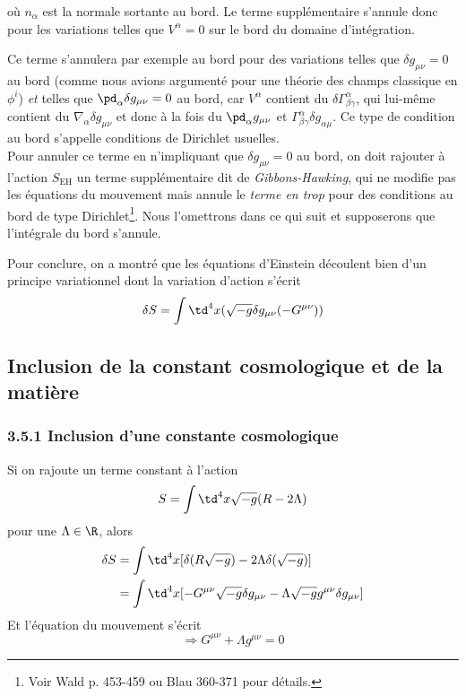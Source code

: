 où $n_{\alpha}$ est la normale sortante au bord. Le terme supplémentaire s'annule donc pour les variations telles que $V^\alpha =0$ sur le bord du domaine d'intégration.
\begin{rmk}
    Ce terme s'annulera par exemple au bord pour des variations telles que $\delta g_{\mu\nu} = 0$ au bord (comme nous avions argumenté pour une théorie des champs classique en $\phi^i$) \emph{et} telles que $\pd_\alpha \delta g_{\mu\nu} = 0$ au bord, car $V^\alpha$ contient du $\delta \Gamma^\alpha_{\beta\gamma}$, qui lui-même contient du $\nabla_\alpha \delta g_{\mu\nu}$ et donc à la fois du $\pd_\alpha g_{\mu\nu}$ et $\Gamma^\alpha_{\beta \gamma} \delta g_{\alpha \mu}$. Ce type de condition au bord s'appelle conditions de Dirichlet usuelles.\\
    Pour annuler ce terme en n'impliquant que $\delta g_{\mu\nu} = 0$ au bord, on doit rajouter à l'action $S_\text{EH}$ un terme supplémentaire dit de \emph{Gibbons-Hawking}, qui ne modifie pas les équations du mouvement mais annule le \emph{terme en trop} pour des conditions au bord de type Dirichlet\footnote{Voir Wald p. 453-459 ou Blau 360-371 pour détails.}. Nous l'omettrons dans ce qui suit et supposerons que l'intégrale du bord s'annule.
\end{rmk}

Pour conclure, on a montré que les équations d'Einstein découlent bien d'un principe variationnel dont la variation d'action s'écrit
\begin{equation}
    \delta S = \int \td ^4x (\sqrt{-g}\delta g_{\mu \nu}( -G^{\mu \nu}))
\end{equation}
\subsection{Inclusion de la constant cosmologique et de la matière}

\subsubsection{3.5.1 Inclusion d'une constante cosmologique}
Si on rajoute un terme constant à l'action
\begin{equation}
    S = \int \td ^4x \sqrt{-g}(R - 2\Lambda)
\end{equation}
pour une $\Lambda \in \R$, alors
\begin{align}
    \delta S &= \int \td ^4x [\delta (R \sqrt{-g}) -2  \Lambda \delta (\sqrt{-g})]\\
    &= \int \td ^4x [-G^{\mu \nu} \sqrt{-g} \delta g_{\mu \nu} - \Lambda \sqrt{-g} g^{\mu \nu}\delta g_{\mu \nu}]
\end{align}
Et l'équation du mouvement s'écrit
\begin{equation}
   \Rightarrow G^{\mu \nu} + \Lambda g^{\mu \nu} = 0
\end{equation}
